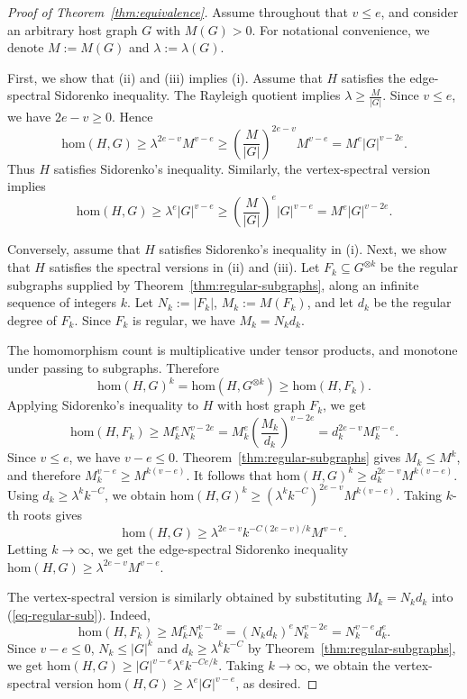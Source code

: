 \documentclass[10pt,a4paper]{amsart}
\newcommand{\homc}{\mathrm{hom}}
\begin{document}
\begin{proof}[Proof of Theorem~\ref{thm:equivalence}]
Assume throughout that \(v\le e\), and consider an arbitrary host graph \(G\) with
\(M(G)>0\). For notational convenience, we denote $M:=M(G)$ and $\lambda:=\lambda(G).$

First, we show that (ii) and (iii) implies (i).  Assume that \(H\) satisfies the edge-spectral Sidorenko inequality.
The Rayleigh quotient implies $\lambda\ge \frac{M}{|G|}.$
Since \(v\le e\), we have \(2e-v\ge0\).  Hence
\[
\homc(H,G)\ge\lambda^{2e-v}M^{v-e}\ge
        \left(\frac{M}{|G|}\right)^{2e-v}M^{v-e}=
        M^e |G|^{v-2e}.
\]
Thus \(H\) satisfies Sidorenko's inequality. Similarly, the vertex-spectral version implies 
\[ \homc (H,G) \ge \lambda^{e}|G|^{v-e} \ge 
\left( \frac{M}{|G|}\right)^e |G|^{v-e} = M^e |G|^{v-2e}. \]

Conversely, assume that \(H\) satisfies Sidorenko's inequality in (i). Next, we show that $H$ satisfies the spectral versions in (ii) and (iii).   
Let \(F_k\subseteq G^{\otimes k}\) be the regular subgraphs supplied by
Theorem~\ref{thm:regular-subgraphs}, along an infinite sequence of
integers \(k\).  Let $N_k:=|F_k|$, $M_k:=M(F_k)$,
and let \(d_k\) be the regular degree of \(F_k\).  Since \(F_k\) is
regular, we have $M_k=N_kd_k.$

The homomorphism count is multiplicative under tensor products, and
monotone under passing to subgraphs.  Therefore
\[
        \homc(H,G)^k
        =
        \homc(H,G^{\otimes k})
        \ge
        \homc(H,F_k).
\]
Applying Sidorenko's inequality to \(H\) with host graph \(F_k\), we get
\begin{equation} \label{eq-regular-sub}
\homc(H,F_k)
        \ge
        M_k^e N_k^{v-2e}                                      =
        M_k^e\left(\frac{M_k}{d_k}\right)^{v-2e}              =
        d_k^{2e-v}M_k^{v-e}.
\end{equation}
Since \(v\le e\), we have \(v-e\le0\).  Theorem~\ref{thm:regular-subgraphs}
gives \(M_k\le M^k\), and therefore $M_k^{v-e}\ge M^{k(v-e)}$.
It follows that
$        \homc(H,G)^k
        \ge
        d_k^{2e-v}M^{k(v-e)}.$
Using \(d_k\ge \lambda^k k^{-C}\), we obtain $\homc(H,G)^k
        \ge
        \left(\lambda^k k^{-C}\right)^{2e-v}M^{k(v-e)}$.
Taking \(k\)-th roots gives
\[
        \homc(H,G)
        \ge
        \lambda^{2e-v}k^{-C(2e-v)/k}M^{v-e}.
\]
Letting \(k\to\infty\), we get the edge-spectral Sidorenko inequality $\homc(H,G)\ge \lambda^{2e-v}M^{v-e}$. 

The vertex-spectral version is similarly obtained by substituting $M_k=N_kd_k$ into (\ref{eq-regular-sub}). Indeed, 
\[ \homc(H,F_k) \ge M_k^e N_k^{v-2e} = (N_kd_k)^e N_k^{v-2e} =N_k^{v-e} d_k^e. \]
Since $v-e\le 0$, $N_k\le |G|^k$ and $d_k \ge \lambda^k k^{-C}$ by Theorem~\ref{thm:regular-subgraphs}, we get $\homc (H,G)\ge |G|^{v-e} \lambda^{e} k^{-Ce/k}$. Taking $k\to \infty$, we  obtain the vertex-spectral version $\homc(H,G) \ge \lambda^e |G|^{v-e}$, as desired.    
\end{proof}
\end{document}
